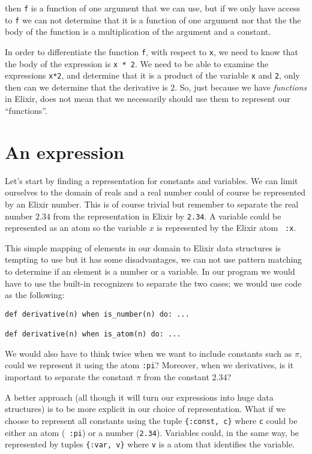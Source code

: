 \documentclass[a4paper,11pt]{article}
\begin{document}
then {\tt f} is a function of one argument that we can use, but if we
only have access to {\tt f} we can not determine that it is a function
of one argument nor that the the body of the function is a
multiplication of the argument and a constant.

In order to differentiate the function {\tt f}, with respect to {\tt x}, we
need to know that the body of the expression is {\tt x * 2}. We need to
be able to examine the expressions {\tt x*2}, and determine that it is
a product of the variable {\tt x} and {\tt 2}, only then can we
determine that the derivative is $2$. So, just because we have {\em
    functions} in Elixir, does not mean that we necessarily should use
them to represent our ``functions''.



\section{An expression}

Let's start by finding a representation for constants and
variables. We can limit ourselves to the domain of reals and a real
number could of course be represented by an Elixir number. This is of
course trivial but remember to separate the real number $2.34$ from the
representation in Elixir by {\tt 2.34}. A variable could be represented
as an atom so the variable $x$ is represented by the Elixir atom {\tt
    :x}.

This simple mapping of elements in our domain to Elixir data structures
is tempting to use but it has some disadvantages, we can not use
pattern matching to determine if an element is a number or a
variable. In our program we would have to use the built-in recognizers
to separate the two cases; we would use code as the following:

\begin{verbatim}
def derivative(n) when is_number(n) do: ...

def derivative(n) when is_atom(n) do: ...
\end{verbatim}

We would also have to think twice when we want to include constants
such as $\pi$, could we represent it using the atom {\tt :pi}?
Moreover, when we derivatives, is it important to separate the
constant $\pi$ from the constant $2.34$?

A better approach (all though it will turn our expressions into huge
data structures) is to be more explicit in our choice of
representation. What if we choose to represent all constants using the
tuple {\tt\{:const, c\}} where {\tt c} could be either an atom ({\tt
    :pi}) or a number ({\tt 2.34}). Variables could, in the same way, be
represented by tuples {\tt \{:var, v\}} where {\tt v} is a atom that
identifies the variable.
\end{document}
